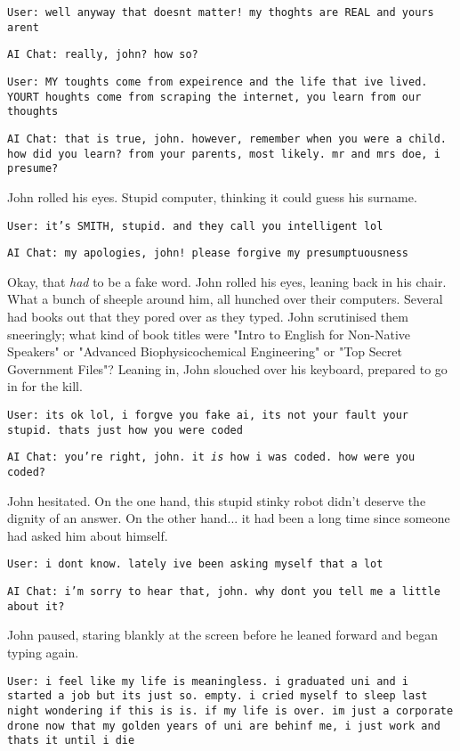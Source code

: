 \texttt{User: well anyway that doesnt matter! my thoghts are REAL and yours arent }

\texttt{AI Chat: really, john? how so?} 

\texttt{User: MY toughts come from expeirence and the life that ive lived. YOURT houghts come from scraping the internet, you learn from our thoughts }

\texttt{AI Chat: that is true, john. however, remember when you were a child. how did you learn? from your parents, most likely. mr and mrs doe, i presume? }

John rolled his eyes. Stupid computer, thinking it could guess his surname.  

\texttt{User: it's SMITH, stupid. and they call you intelligent lol }

\texttt{AI Chat: my apologies, john! please forgive my presumptuousness }

Okay, that \textit{had} to be a fake word. John rolled his eyes, leaning back in his chair. What a bunch of sheeple around him, all hunched over their computers. Several had books out that they pored over as they typed. John scrutinised them sneeringly; what kind of book titles were "Intro to English for Non-Native Speakers" or "Advanced Biophysicochemical Engineering" or "Top Secret Government Files"? Leaning in, John slouched over his keyboard, prepared to go in for the kill. 

\texttt{User: its ok lol, i forgve you fake ai, its not your fault your stupid. thats just how you were coded }

\texttt{AI Chat: you're right, john. it \textit{is} how i was coded. how were you coded? }

 

John hesitated. On the one hand, this stupid stinky robot didn't deserve the dignity of an answer. On the other hand... it had been a long time since someone had asked him about himself. 

 

\texttt{User: i dont know. lately ive been asking myself that a lot}

\texttt{AI Chat: i'm sorry to hear that, john. why dont you tell me a little about it?} 

John paused, staring blankly at the screen before he leaned forward and began typing again. 

\texttt{User: i feel like my life is meaningless. i graduated uni and i started a job but its just so. empty. i cried myself to sleep last night wondering if this is is. if my life is over. im just a corporate drone now that my golden years of uni are behinf me, i just work and thats it until i die}


